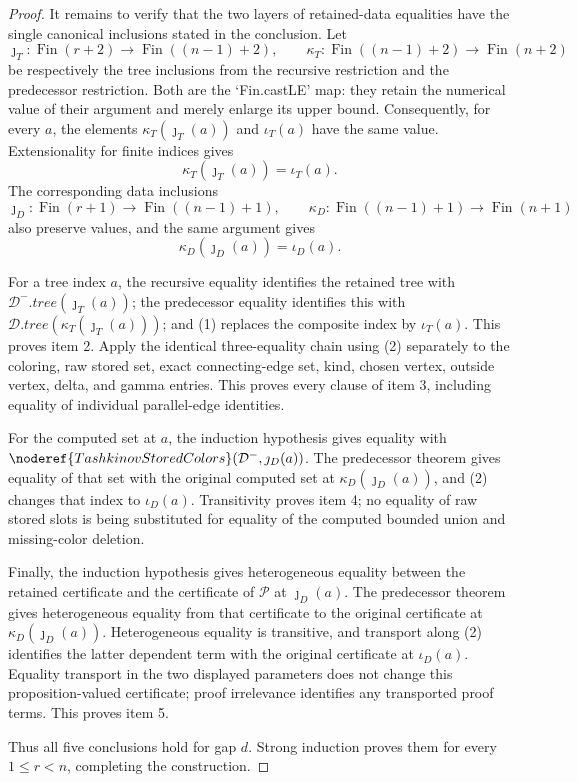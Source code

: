 \begin{proof}
It remains to verify that the two layers of retained-data equalities have
the single canonical inclusions stated in the conclusion.  Let
\[
 \jmath_T:\operatorname{Fin}(r+2)\to
              \operatorname{Fin}((n-1)+2),\qquad
 \kappa_T:\operatorname{Fin}((n-1)+2)\to
              \operatorname{Fin}(n+2)
\]
be respectively the tree inclusions from the recursive restriction and
the predecessor restriction.  Both are the `Fin.castLE' map: they retain
the numerical value of their argument and merely enlarge its upper
bound.  Consequently, for every $a$, the elements
$\kappa_T(\jmath_T(a))$ and $\iota_T(a)$ have the same value.  Extensionality
for finite indices gives
\[
                         \kappa_T(\jmath_T(a))=\iota_T(a).       \tag{1}
\]
The corresponding data inclusions
\[
 \jmath_D:\operatorname{Fin}(r+1)\to
              \operatorname{Fin}((n-1)+1),\qquad
 \kappa_D:\operatorname{Fin}((n-1)+1)\to
              \operatorname{Fin}(n+1)
\]
also preserve values, and the same argument gives
\[
                         \kappa_D(\jmath_D(a))=\iota_D(a).       \tag{2}
\]

For a tree index $a$, the recursive equality identifies the retained
tree with $\mathcal D^-.\mathit{tree}(\jmath_T(a))$; the predecessor
equality identifies this with
$\mathcal D.\mathit{tree}(\kappa_T(\jmath_T(a)))$; and (1) replaces the
composite index by $\iota_T(a)$.  This proves item 2.  Apply the identical
three-equality chain using (2) separately to the coloring, raw stored
set, exact connecting-edge set, kind, chosen vertex, outside vertex,
delta, and gamma entries.  This proves every clause of item 3, including
equality of individual parallel-edge identities.

For the computed set at $a$, the induction hypothesis gives equality
with
$\noderef{TashkinovStoredColors}(\mathcal D^-,\jmath_D(a))$.
The predecessor theorem gives equality of that set with the original
computed set at $\kappa_D(\jmath_D(a))$, and (2) changes that index to
$\iota_D(a)$.  Transitivity proves item 4; no equality of raw stored slots
is being substituted for equality of the computed bounded union and
missing-color deletion.

Finally, the induction hypothesis gives heterogeneous equality between
the retained certificate and the certificate of $\mathcal P$ at
$\jmath_D(a)$.  The predecessor theorem gives heterogeneous equality
from that certificate to the original certificate at
$\kappa_D(\jmath_D(a))$.  Heterogeneous equality is transitive, and
transport along (2) identifies the latter dependent term with the
original certificate at $\iota_D(a)$.  Equality transport in the two
displayed parameters does not change this proposition-valued
certificate; proof irrelevance identifies any transported proof terms.
This proves item 5.

Thus all five conclusions hold for gap $d$.  Strong induction proves them
for every $1\leq r<n$, completing the construction.
\end{proof}
